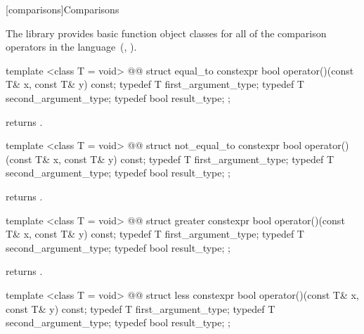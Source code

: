 \setcounter{subsection}{5}
[comparisons]{Comparisons}

\pnum
The library provides basic function object classes for all of the comparison
operators in the language~(, ).

%
\begin{itemdecl}
template <class T = void>
  @@
struct equal_to {
  constexpr bool operator()(const T& x, const T& y) const;
  typedef T first_argument_type;
  typedef T second_argument_type;
  typedef bool result_type;
};
\end{itemdecl}

\begin{itemdescr}
\pnum
{} returns .
\end{itemdescr}

%
\begin{itemdecl}
template <class T = void>
  @@
struct not_equal_to {
  constexpr bool operator()(const T& x, const T& y) const;
  typedef T first_argument_type;
  typedef T second_argument_type;
  typedef bool result_type;
};
\end{itemdecl}

\begin{itemdescr}
\pnum
{} returns .
\end{itemdescr}

%
\begin{itemdecl}
template <class T = void>
  @@
struct greater {
  constexpr bool operator()(const T& x, const T& y) const;
  typedef T first_argument_type;
  typedef T second_argument_type;
  typedef bool result_type;
};
\end{itemdecl}

\begin{itemdescr}
\pnum
{} returns .
\end{itemdescr}

%
\begin{itemdecl}
template <class T = void>
  @@
struct less {
  constexpr bool operator()(const T& x, const T& y) const;
  typedef T first_argument_type;
  typedef T second_argument_type;
  typedef bool result_type;
};
\end{itemdecl}


